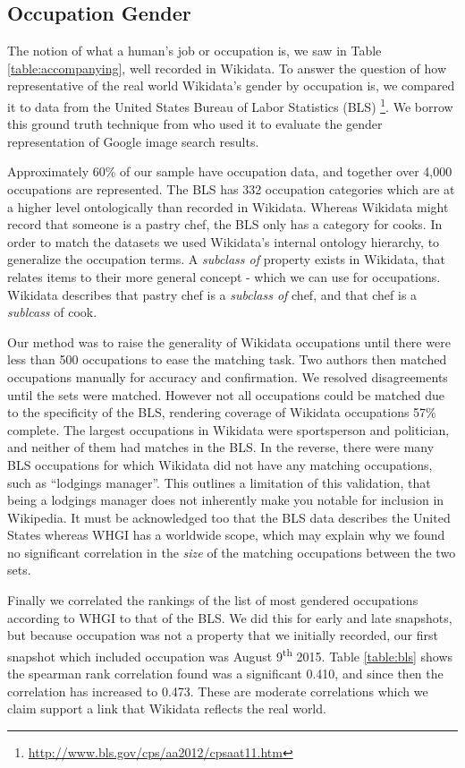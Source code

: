 \documentclass{sig-alternate-05-2015}
\begin{document}
\subsection{Occupation Gender}
The notion of what a human's job or occupation is, we saw in Table \ref{table:accompanying}, well recorded in Wikidata. To answer the question of how representative of the real world Wikidata's gender by occupation is, we compared it to data from the United States Bureau of Labor Statistics (BLS) \footnote{\url{http://www.bls.gov/cps/aa2012/cpsaat11.htm}}. We borrow this ground truth technique from \cite{kay_unequal_2015} who used it to evaluate the gender representation of Google image search results.

Approximately 60\% of our sample have occupation data, and together over 4,000 occupations are represented. The BLS has 332 occupation categories which are at a higher level ontologically than  recorded in Wikidata. Whereas Wikidata might record that someone is a pastry chef, the BLS only has a category for cooks. In order to match the datasets we used Wikidata's internal ontology hierarchy, to generalize the occupation terms. A \textit{subclass of} property exists in Wikidata, that relates items to their more general concept - which we can use for occupations. Wikidata describes that pastry chef is a \textit{subclass of} chef, and that chef is a \textit{sublcass} of cook. 

Our method was to raise the generality of Wikidata occupations until there were less than 500 occupations to ease the matching task. Two authors then matched occupations manually for accuracy and confirmation. We resolved disagreements until the sets were matched. However not all occupations could be matched due to the specificity of the BLS, rendering coverage of Wikidata occupations 57\% complete. The largest occupations in Wikidata were sportsperson and politician, and neither of them had matches in the BLS. In the reverse, there were many BLS occupations for which Wikidata did not have any matching occupations, such as ``lodgings manager''. This outlines a limitation of this validation, that being a lodgings manager does not inherently make you notable for inclusion in Wikipedia. It must be acknowledged too that the BLS data describes the United States whereas WHGI has a worldwide scope, which may explain why we found no significant correlation in the \textit{size} of the matching occupations between the two sets.

Finally we correlated the rankings of the list of most gendered occupations according to WHGI to that of the BLS. We did this for early and late snapshots, but because occupation was not a property that we initially recorded, our first snapshot which included occupation was August 9\textsuperscript{th} 2015.  Table \ref{table:bls} shows the spearman rank correlation found was a significant 0.410, and since then the correlation has increased to 0.473. These are moderate correlations which we claim support a link that Wikidata reflects the real world.
\end{document}
